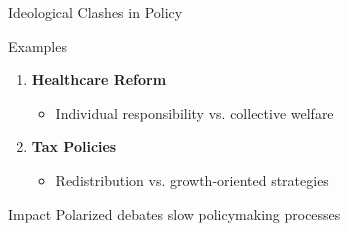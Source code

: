 \documentclass{beamer}  %
\begin{document}
\begin{frame}{Ideological Clashes in Policy}
    \begin{block}{Examples}
        \begin{enumerate}
            \item \textbf{Healthcare Reform}
            \begin{itemize}
                \item Individual responsibility vs. collective welfare
            \end{itemize}
            
            \item \textbf{Tax Policies}
            \begin{itemize}
                \item Redistribution vs. growth-oriented strategies
            \end{itemize}
        \end{enumerate}
    \end{block}
    
    \begin{alertblock}{Impact}
        Polarized debates slow policymaking processes
    \end{alertblock}
\end{frame}
\end{document}
